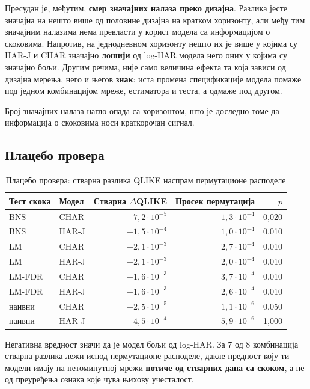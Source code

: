Пресудан је, међутим, \textbf{смер значајних налаза преко дизајна}. Разлика јесте
значајна на нешто више од половине дизајна на кратком хоризонту, али међу тим значајним
налазима нема превласти у корист модела са информацијом о скоковима. Напротив, на
једнодневном хоризонту нешто их је више у којима су HAR-J и CHAR значајно
\textbf{лошији} од log-HAR модела него оних у којима су значајно бољи. Другим речима,
није само величина ефекта та која зависи од дизајна мерења, него и његов \textbf{знак}:
иста промена спецификације модела помаже под једном комбинацијом мреже, естиматора и
теста, а одмаже под другом.

Број значајних налаза нагло опада са хоризонтом, што је доследно томе да информација о
скоковима носи краткорочан сигнал.

\subsection{Плацебо провера}

\begin{table}[htbp]
\centering
\caption{Плацебо провера: стварна разлика QLIKE наспрам пермутационе расподеле}
\label{tab:placebo}
\begin{tabular}{llrrr}
\toprule
Тест скока & Модел & Стварна $\Delta$QLIKE & Просек пермутација & $p$ \\
\midrule
BNS     & CHAR  & $-7{,}2\cdot10^{-5}$ & $1{,}3\cdot10^{-4}$ & 0,020 \\
BNS     & HAR-J & $-1{,}5\cdot10^{-4}$ & $1{,}0\cdot10^{-4}$ & 0,010 \\
LM      & CHAR  & $-2{,}1\cdot10^{-3}$ & $2{,}7\cdot10^{-4}$ & 0,010 \\
LM      & HAR-J & $-2{,}1\cdot10^{-3}$ & $2{,}0\cdot10^{-4}$ & 0,010 \\
LM-FDR  & CHAR  & $-1{,}6\cdot10^{-3}$ & $3{,}7\cdot10^{-4}$ & 0,010 \\
LM-FDR  & HAR-J & $-1{,}6\cdot10^{-3}$ & $2{,}6\cdot10^{-4}$ & 0,010 \\
наивни  & CHAR  & $-2{,}5\cdot10^{-5}$ & $1{,}1\cdot10^{-6}$ & 0,050 \\
наивни  & HAR-J & $4{,}5\cdot10^{-4}$  & $5{,}9\cdot10^{-6}$ & 1,000 \\
\bottomrule
\end{tabular}
\end{table}

Негативна вредност значи да је модел бољи од log-HAR. За 7 од 8 комбинација
стварна разлика лежи испод пермутационе расподеле, дакле предност коју ти модели имају
на петоминутној мрежи \textbf{потиче од стварних дана са скоком}, а не од преуређења
ознака које чува њихову учесталост.

